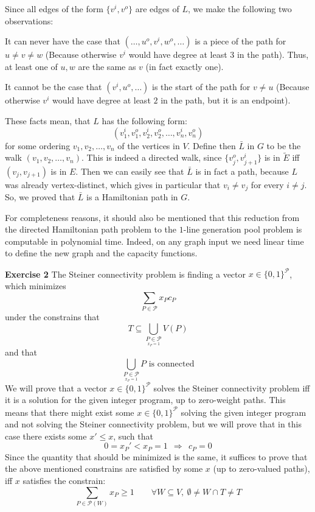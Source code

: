 \documentclass[12pt]{article}
\newenvironment{a_enum}{\begin{enumerate}[label=(\alph{*})]}{\end{enumerate}} %
\newenvironment{b_item}{\begin{itemize}}{\end{itemize}} %
\begin{document}
\begin{a_enum}
Since all edges of the form $\{v^i,v^o\}$ are edges of $L$, we make the following two observations:
\begin{b_item} \item It can never have the case that $(\ldots,u^o,v^i,w^o,\ldots)$ is a piece of the path for $u\neq v\neq w$ (Because otherwise $v^i$ would have degree at least $3$ in the path). Thus, at least one of $u,w$ are the same as $v$ (in fact exactly one).
\item It cannot be the case that $(v^i,u^o,\ldots)$ is the start of the path for $v\neq u$ (Because otherwise $v^i$ would have degree at least $2$ in the path, but it is an endpoint).
\end{b_item}
These facts mean, that $L$ has the following form:
$$(v_1^i,v_1^o,v_2^i,v_2^o,\ldots,v_n^i,v_n^o)$$
for some ordering $v_1,v_2,\ldots,v_n$ of the vertices in $V$.
Define then $\bar L$ in $G$ to be the walk $(v_1,v_2,\ldots,v_n)$. This is indeed a directed walk, since $\{v_j^o,v_{j+1}^i\}$ is in $\tilde E$ iff $(v_j,v_{j+1})$ is in $E$. Then we can easily see that $\bar L$ is in fact a path, because $L$ was already vertex-distinct, which gives in particular that $v_i\neq v_j$ for every $i\neq j$. So, we proved that $\bar L$ is a Hamiltonian path in $G$.

For completeness reasons, it should also be mentioned that this reduction from the directed Hamiltonian path problem to the $1$-line generation pool problem is computable in polynomial time. Indeed, on any graph input we need linear time to define the new graph and the capacity functions.
\end{a_enum}
{\bf Exercise 2} The Steiner connectivity problem is finding a vector $x\in\{0,1\}^{\mathcal{P}}$, which minimizes
$$\sum_{P\in\mathcal{P}}x_Pc_P$$
under the constrains that
$$T\subseteq\bigcup_{\underset{x_P=1}{P\in\mathcal{P}}}V(P)$$
and that
$$\bigcup_{\underset{x_P=1}{P\in\mathcal{P}}}P\text{ is connected}$$
We will prove that a vector $x\in\{0,1\}^{\mathcal{P}}$ solves the Steiner connectivity problem iff it is a solution for the given integer program, up to zero-weight paths. This means that there might exist some $x\in\{0,1\}^{\mathcal{P}}$ solving the given integer program and not solving the Steiner connectivity problem, but we will prove that in this case there exists some $x'\leq x$, such that
$$0=x_P'<x_P=1\ \ \Rightarrow\ \ c_P=0$$Since the quantity that should be minimized is the same, it suffices to prove that the above mentioned constrains are satisfied by some $x$ (up to zero-valued paths), iff $x$ satisfies the constrain:
$$\sum_{P\in\mathcal{P}(W)}x_P\geq1\qquad\forall W\subseteq V,\ \emptyset\neq W\cap T\neq T$$
\end{document}
